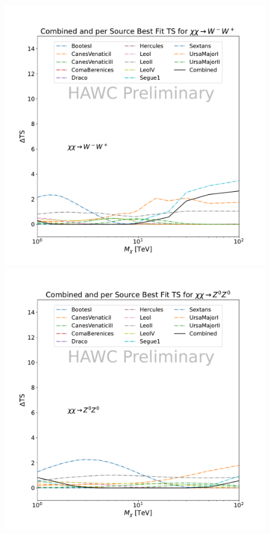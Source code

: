 \begin{figure}[h]
{        \includegraphics[scale=0.21]{figures/glory_duck/hawc/CombinedTS_data_ww_.pdf}
        \includegraphics[scale=0.21]{figures/glory_duck/hawc/CombinedTS_data_zz_.pdf}
}
\end{figure}

